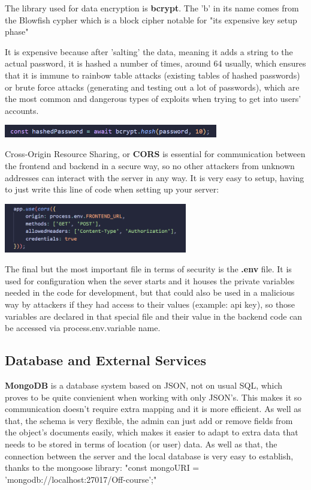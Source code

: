 \documentclass[12pt,a4paper]{report}
\begin{document}
The library used for data encryption is \textbf{bcrypt}. The 'b' in its name comes from the Blowfish cypher which is a block cipher notable for "its expensive key setup phase"~\cite{blowfishCipher}

It is expensive because after 'salting' the data, meaning it adds a string to the actual password, it is hashed a number of times, around 64 usually, which ensures that it is immune to rainbow table attacks (existing tables of hashed passwords) or brute force attacks (generating and testing out a lot of passwords), which are the most common and dangerous types of exploits when trying to get into users' accounts.

\begin{center}
\includegraphics[width=0.7\textwidth]{images/bcrypt.png}
\end{center}

Cross-Origin Resource Sharing, or \textbf{CORS} is essential for communication between the frontend and backend in a secure way, so no other attackers from unknown addresses can interact with the server in any way. It is very easy to setup, having to just write this line of code when setting up your server: 

\begin{center}
\includegraphics[width=0.6\textwidth]{images/cors.png}
\end{center}

The final but the most important file in terms of security is the \textbf{.env} file. It is used for configuration when the sever starts and it houses the private variables needed in the code for development, but that could also be used in a malicious way by attackers if they had access to their values (example: api key), so those variables are declared in that special file and their value in the backend code can be accessed via process.env.variable name.

\subsection{Database and External Services}

\textbf{MongoDB} is a database system based on JSON, not on usual SQL, which proves to be quite convienient when working with only JSON's. This makes it so communication doesn't require extra mapping and it is more efficient. As well as that, the schema is very flexible, the admin can just add or remove fields from the object's documents easily, which makes it easier to adapt to extra data that needs to be stored in terms of location (or user) data. As well as that, the connection between the server and the local database is very easy to establish, thanks to the mongoose library: "const mongoURI = 'mongodb://localhost:27017/Off-course';"
\end{document}
